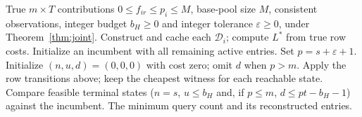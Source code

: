 \begin{algorithm}[t]
\caption{Offline minimum joint witness by row states}
\label{alg:offline-joint}
\begin{algorithmic}[1]
\REQUIRE True $m\times T$ contributions $0\le f_{ir}\le p_i\le M$, base-pool size $M$, consistent observations, integer budget $b_H\ge0$ and integer tolerance $\varepsilon\ge0$, under Theorem~\ref{thm:joint}.
\STATE Construct and cache each $\mathcal D_i$; compute $L^*$ from true row costs.
\STATE Initialize an incumbent with all remaining active entries.
\STATE Set $p=s+\varepsilon+1$.
\STATE Initialize $(n,u,d)=(0,0,0)$ with cost zero; omit $d$ when $p>m$.
\STATE Apply the row transitions above; keep the cheapest witness for each reachable state.
\STATE Compare feasible terminal states ($n=s$, $u\le b_H$ and, if $p\le m$, $d\le pt-b_H-1$) against the incumbent.
\ENDFOR
\ENDFOR
\RETURN The minimum query count and its reconstructed entries.
\end{algorithmic}
\end{algorithm}

